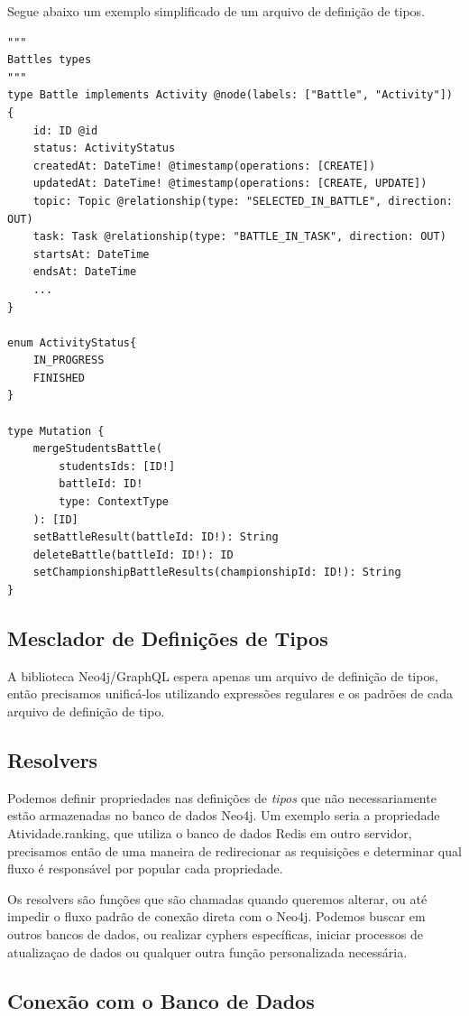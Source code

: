 Segue abaixo um exemplo simplificado de um arquivo de definição de tipos.
\begin{lstlisting}
"""
Battles types
"""
type Battle implements Activity @node(labels: ["Battle", "Activity"]) {
	id: ID @id
	status: ActivityStatus
	createdAt: DateTime! @timestamp(operations: [CREATE])
	updatedAt: DateTime! @timestamp(operations: [CREATE, UPDATE])
	topic: Topic @relationship(type: "SELECTED_IN_BATTLE", direction: OUT)
	task: Task @relationship(type: "BATTLE_IN_TASK", direction: OUT)
	startsAt: DateTime
	endsAt: DateTime
    ...
}

enum ActivityStatus{
    IN_PROGRESS
    FINISHED
}

type Mutation {
	mergeStudentsBattle(
		studentsIds: [ID!]
		battleId: ID!
		type: ContextType
	): [ID]
	setBattleResult(battleId: ID!): String
	deleteBattle(battleId: ID!): ID
	setChampionshipBattleResults(championshipId: ID!): String
}
\end{lstlisting}

\subsection{Mesclador de Definições de Tipos}

A biblioteca Neo4j/GraphQL espera apenas um arquivo de definição de tipos, então precisamos unificá-los utilizando expressões regulares e os padrões de cada arquivo de definição de tipo.

\subsection{Resolvers}

Podemos definir propriedades nas definições de \textit{tipos} que não necessariamente estão armazenadas no banco de dados Neo4j. Um exemplo seria a propriedade Atividade.ranking, que utiliza o banco de dados Redis em outro servidor, precisamos então de uma maneira de redirecionar as requisições e determinar qual fluxo é responsável por popular cada propriedade.

Os resolvers são funções que são chamadas quando queremos alterar, ou até impedir o fluxo padrão de conexão direta com o Neo4j. Podemos buscar em outros bancos de dados, ou realizar cyphers específicas, iniciar processos de atualizaçao de dados ou qualquer outra função personalizada necessária.

\subsection{Conexão com o Banco de Dados}

